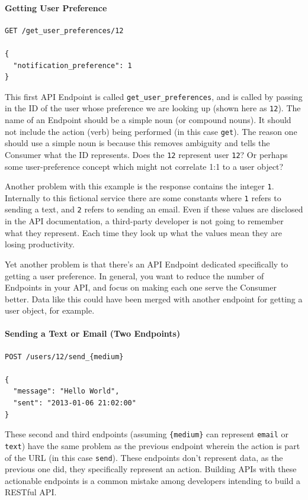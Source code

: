 \documentclass{book}
\begin{document}
\paragraph{\textbf{Getting User Preference}}

\begin{verbatim}
GET /get_user_preferences/12

{
  "notification_preference": 1
}
\end{verbatim}

This first API Endpoint is called \texttt{get\_user\_preferences}, and is called by passing in the ID of the user whose preference we are looking up (shown here as \texttt{12}). The name of an Endpoint should be a simple noun (or compound nouns). It should not include the action (verb) being performed (in this case \texttt{get}). The reason one should use a simple noun is because this removes ambiguity and tells the Consumer what the ID represents. Does the \texttt{12} represent user \texttt{12}? Or perhaps some user-preference concept which might not correlate 1:1 to a user object?

Another problem with this example is the response contains the integer \texttt{1}. Internally to this fictional service there are some constants where \texttt{1} refers to sending a text, and \texttt{2} refers to sending an email. Even if these values are disclosed in the API documentation, a third-party developer is not going to remember what they represent. Each time they look up what the values mean they are losing productivity.

Yet another problem is that there's an API Endpoint dedicated specifically to getting a user preference. In general, you want to reduce the number of Endpoints in your API, and focus on making each one serve the Consumer better. Data like this could have been merged with another endpoint for getting a user object, for example.

\paragraph{\textbf{Sending a Text or Email (Two Endpoints)}}

\begin{verbatim}
POST /users/12/send_{medium}

{
  "message": "Hello World",
  "sent": "2013-01-06 21:02:00"
}
\end{verbatim}

These second and third endpoints (assuming \texttt{\{medium\}} can represent \texttt{email} or \texttt{text}) have the same problem as the previous endpoint wherein the action is part of the URL (in this case \texttt{send}). These endpoints don't represent data, as the previous one did, they specifically represent an action. Building APIs with these actionable endpoints is a common mistake among developers intending to build a RESTful API.
\end{document}
